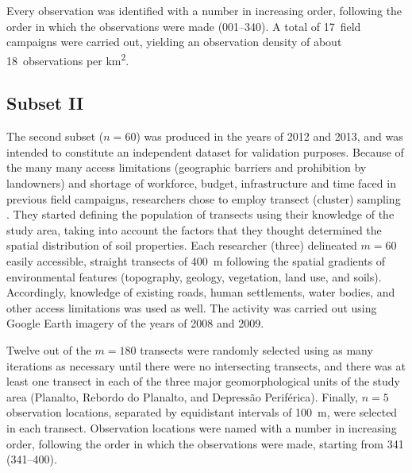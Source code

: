 Every observation was identified with a number in increasing order, following the order in which 
the observations were made (\num{001}--\num{340}). A total of \num{17}~field campaigns were carried out,
yielding an observation density of about \num{18}~observations per \si{\kilo\metre\squared}.

\tocless\subsection{Subset II}

The second subset ($n = 60$) was produced in the years of \num{2012} and \num{2013}, and was intended to 
constitute an independent dataset for validation purposes. Because of the many many access limitations 
(geographic barriers and prohibition by landowners) and shortage of workforce, budget, infrastructure and 
time faced in previous field campaigns, researchers chose to employ transect (cluster) sampling 
\cite{MiguelEtAl2012,Moura-BuenoEtAl2012,Samuel-RosaEtAl2013}. They started defining the population of 
transects using their knowledge of the study area, taking into account the factors that they thought 
determined the spatial distribution of soil properties. Each researcher (three) delineated $m = 60$ easily 
accessible, straight transects of \SI{400}{\metre} following the spatial gradients of environmental features 
(topography, geology, vegetation, land use, and soils). Accordingly, knowledge of existing roads, human 
settlements, water bodies, and other access limitations was used as well. The activity was carried out using 
Google Earth\textregistered{} imagery of the years of \num{2008} and \num{2009}.


Twelve out of the $m = 180$ transects were randomly selected using as many iterations as necessary until 
there were no intersecting transects, and there was at least one transect in each of the three major 
geomorphological units of the study area (Planalto, Rebordo do Planalto, and Depressão Periférica). 
Finally, $n = 5$ observation locations, separated by equidistant intervals of \SI{100}{\metre}, were 
selected in each transect. Observation locations were named with a number in increasing order, 
following the order in which the observations were made, starting from \num{341} (\num{341}--\num{400}).

